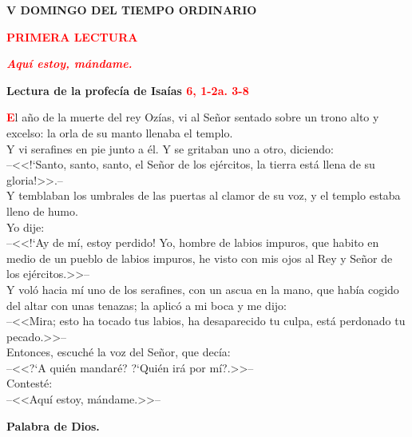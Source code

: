 \documentclass[12pt, letterpaper]{report}
\begin{document}

\begin{center}
\Huge {\bfseries V DOMINGO DEL TIEMPO ORDINARIO}
\end{center}

\begin{center}
\Large {\bfseries \textcolor{red}{PRIMERA LECTURA}}
\end{center}

\begin{center}
\large {\bfseries \textit{ \textcolor{red}{Aqu\'i estoy, m\'andame.}}}
\end{center}

\Large {\bfseries Lectura de la profec\'ia de  Isa\'ias \hspace{1cm} \textcolor{red}{6, 1-2a. 3-8}}

\lettrine[lines=2]{\bfseries \textcolor{red}{E}}{}\Large l a\~no de la muerte del rey Oz\'ias, vi al Se\~nor sentado sobre un trono alto y excelso: la orla de su manto llenaba el templo. \\
Y vi serafines en pie junto a \'el. Y se gritaban uno a otro, diciendo:\\
--<<!`Santo, santo, santo, el Se\~nor de los ej\'ercitos, la tierra est\'a llena de su gloria!>>.--\\
Y temblaban los umbrales de las puertas al clamor de su voz, y el templo estaba lleno de humo. \\
Yo dije:\\
--<<!`Ay de m\'i, estoy perdido! Yo, hombre de labios impuros, que habito en medio de un pueblo de labios impuros, he visto con mis ojos al Rey y Se\~nor de los ej\'ercitos.>>--\\
Y vol\'o hacia m\'i uno de los serafines, con un ascua en la mano, que hab\'ia cogido del altar con unas tenazas; la aplic\'o a mi boca y me dijo:\\
--<<Mira; esto ha tocado tus labios, ha desaparecido tu culpa, est\'a perdonado tu pecado.>>--\\
Entonces, escuch\'e la voz del Se\~nor, que dec\'ia:\\
--<<?`A qui\'en mandar\'e? ?`Qui\'en ir\'a por m\'i?.>>--\\
Contest\'e:\\
--<<Aqu\'i estoy, m\'andame.>>--

{\bfseries Palabra de Dios.}
\end{document}
